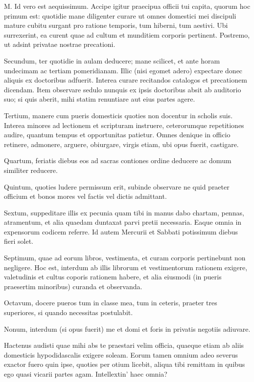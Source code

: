 \documentclass{article}
\begin{document}
M. Id vero est aequissimum. Accipe igitur praecipua officii tui capita, quorum hoc primum est: 
quotidie mane diligenter curare ut omnes domestici mei discipuli mature cubitu surgant pro ratione temporis, tum hiberni, tum aestivi. Ubi surrexerint, ea curent quae ad cultum et munditiem corporis pertinent. Postremo, ut adsint privatae nostrae precationi.

Secundum, ter quotidie in aulam deducere; mane scilicet, et ante horam undecimam ac tertiam pomeridianam. Illic (nisi egomet adero) expectare donec aliquis ex doctoribus adfuerit. Interea curare recitandos catalogos et precationem dicendam. Item observare sedulo nunquis ex ipsis doctoribus absit ab auditorio suo; si quis aberit, mihi statim renuntiare aut eius partes agere.

Tertium, manere cum pueris domesticis quoties non docentur in scholis suis. Interea minores ad lectionem et scripturam instruere, ceterorumque repetitiones audire, quantum tempus et opportunitas patietur. Omnes denique in officio retinere, admonere, arguere, obiurgare, virgis etiam, ubi opus fuerit, castigare.

Quartum, feriatis diebus eos ad sacras contiones ordine deducere ac domum similiter reducere.

Quintum, quoties ludere permissum erit, subinde observare ne quid praeter officium et bonos mores vel factis vel dictis admittant.

Sextum, suppeditare illis ex pecunia quam tibi in manus dabo chartam, pennas, atramentum, et alia quaedam duntaxat parvi pretii necessaria. Eaque omnia in expensorum codicem referre. Id autem Mercurii et Sabbati potissimum diebus fieri solet.

Septimum, quae ad eorum libros, vestimenta, et curam corporis pertinebunt non negligere. Hoc est, interdum ab illis librorum et vestimentorum rationem exigere, valetudinis et cultus coporis rationem habere, et alia eiusmodi (in pueris praesertim minoribus) curanda et observanda.

Octavum, docere pueros tum in classe mea, tum in ceteris, praeter tres superiores, si quando necessitas postulabit.

Nonum, interdum (si opus fuerit) me et domi et foris in privatis negotiis adiuvare.

Hactenus audisti quae mihi abs te praestari velim officia, quaeque etiam ab aliis domesticis hypodidascalis exigere soleam. Eorum tamen omnium adeo severus exactor fuero quin ipse, quoties per otium licebit, aliqua tibi remittam in quibus ego quasi vicarii partes agam. Intellextin' haec omnia?
\end{document}
